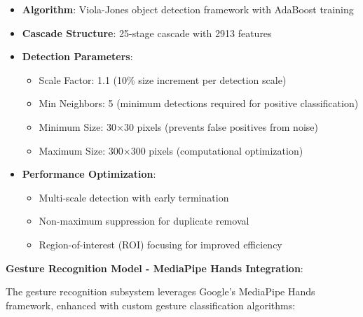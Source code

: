 \documentclass[12pt,a4paper]{article}
\begin{document}
\begin{itemize}
    \item \textbf{Algorithm}: Viola-Jones object detection framework with AdaBoost training
    \item \textbf{Cascade Structure}: 25-stage cascade with 2913 features
    \item \textbf{Detection Parameters}:
        \begin{itemize}
            \item Scale Factor: 1.1 (10\% size increment per detection scale)
            \item Min Neighbors: 5 (minimum detections required for positive classification)
            \item Minimum Size: 30×30 pixels (prevents false positives from noise)
            \item Maximum Size: 300×300 pixels (computational optimization)
        \end{itemize}
    \item \textbf{Performance Optimization}:
        \begin{itemize}
            \item Multi-scale detection with early termination
            \item Non-maximum suppression for duplicate removal
            \item Region-of-interest (ROI) focusing for improved efficiency
        \end{itemize}
\end{itemize}

\textbf{Gesture Recognition Model - MediaPipe Hands Integration}:

The gesture recognition subsystem leverages Google's MediaPipe Hands framework, enhanced with custom gesture classification algorithms:
\end{document}
